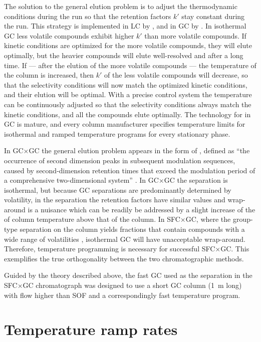 The solution to the general elution problem is to adjust the thermodynamic
conditions during the run so that the retention factors \(k'\) stay constant
during the run. This strategy is implemented in LC by , and in GC by . In isothermal GC less
volatile compounds exhibit higher \(k'\) than more volatile compounds. If
kinetic conditions are optimized for the more volatile compounds, they will
elute optimally, but the heavier compounds will elute well-resolved and after a
long time. If --- after the elution of the more volatile compounds --- the
temperature of the column is increased, then \(k'\) of the less volatile
compounds will decrease, so that the selectivity conditions will now match the
optimized kinetic conditions, and their elution will be optimal. With a precise
control system the temperature can be continuously adjusted so that the
selectivity conditions always match the kinetic conditions, and all the
compounds elute optimally. The technology for 
in GC is mature, and every column manufacturer specifies temperature limits for
isothermal and ramped temperature programs for every stationary phase.

In GC×GC the general elution problem appears in the form of
, defined as ``the occurrence of second dimension peaks in
subsequent modulation sequences, caused by second-dimension retention times that
exceed the modulation period of a comprehensive two-dimensional system''
\autocite{Marriott2012}. In GC×GC the \twoD separation is isothermal, but
because GC separations are predominantly determined by volatility, in the \twoD
separation the retention factors have similar values and wrap-around is a
nuisance which can be readily be addressed by a slight increase of the of \twoD
column temperature above that of the \oneD column. In SFC×GC, where the
group-type separation on the \oneD column yields fractions that contain
compounds with a wide range of volatilities \autocite{Venter1999}, isothermal
GC will have unacceptable wrap-around. Therefore, temperature programming is
necessary for successful SFC×GC. This exemplifies the true orthogonality between
the two chromatographic methods.

Guided by the theory described above, the fast GC used as the \twoD  separation
in the SFC×GC chromatograph was designed to use a short GC column
(\SI{1}{\metre} long) with flow higher than SOF and a correspondingly
fast temperature program.

\section{Temperature ramp rates}
\label{sec:RampRates}

